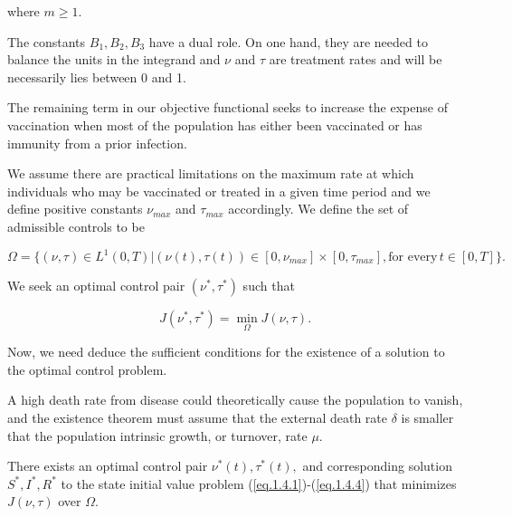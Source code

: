 where $m \geq 1$.

The constants $B_1,B_2,B_3$ have a dual role. On one hand, they are needed to 
balance the units in the integrand and $\nu$ and $\tau$ are treatment rates and 
will be necessarily lies between 0 and 1.

The remaining term in our objective functional seeks to increase the expense of 
vaccination when most of the population has either been vaccinated or has 
immunity from a prior infection.

We assume there are practical limitations on the maximum rate at which 
individuals who may be vaccinated or treated in a given time period and we 
define positive constants $\nu_{max}$ and $\tau_{max}$ accordingly.
We define the set of admissible controls to be 

\begin{equation}\label{eq.1.4.6}
\Omega =\{(\nu,\tau)\in L^1(0,T) |  (\nu (t), \tau (t))\in [0,\nu_{max}]\times 
[0,\tau_{max}], \mbox{for every}\, t\in [0,T]\}.
\end{equation}

We seek an optimal control pair $(\nu^*,\tau^*)$ such that

\begin{equation}\label{eq.1.4.7}
J(\nu^*,\tau^*)=\min_{\Omega}J(\nu,\tau).
\end{equation}

Now, we need deduce the sufficient conditions for the existence of a solution 
to the optimal control problem.

A high death rate from disease could theoretically cause the population to 
vanish, and the existence theorem must assume that the external death rate 
$\delta$ is smaller that the population intrinsic growth, or turnover, rate 
$\mu$.

\begin{theorem}\label{Teo.Ex.Ap}
There exists an optimal control pair $\nu^*(t),\tau^*(t),$ and corresponding 
solution $S^*,I^*,R^*$ to the state initial value problem 
(\ref{eq.1.4.1})-(\ref{eq.1.4.4}) that minimizes $J(\nu,\tau)$ over $\Omega$.
\end{theorem}


